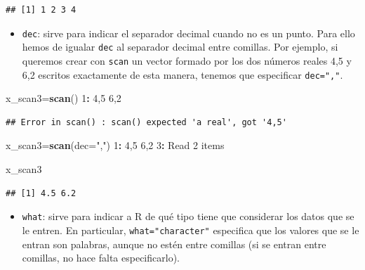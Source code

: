 \documentclass[]{book}
\newenvironment{Shaded}{\begin{snugshade}}{\end{snugshade}}
\newcommand{\DataTypeTok}[1]{\textcolor[rgb]{0.13,0.29,0.53}{#1}}
\newcommand{\DecValTok}[1]{\textcolor[rgb]{0.00,0.00,0.81}{#1}}
\newcommand{\KeywordTok}[1]{\textcolor[rgb]{0.13,0.29,0.53}{\textbf{#1}}}
\newcommand{\NormalTok}[1]{#1}
\newcommand{\OperatorTok}[1]{\textcolor[rgb]{0.81,0.36,0.00}{\textbf{#1}}}
\newcommand{\StringTok}[1]{\textcolor[rgb]{0.31,0.60,0.02}{#1}}
\providecommand{\tightlist}{%
  \setlength{\itemsep}{0pt}\setlength{\parskip}{0pt}}
\theoremstyle{definition}
\theoremstyle{definition}
\theoremstyle{definition}
\theoremstyle{remark}
\begin{document}
\begin{verbatim}
## [1] 1 2 3 4
\end{verbatim}

\begin{itemize}
\tightlist
\item
  \texttt{dec}: sirve para indicar el separador decimal cuando no es un punto.
  Para ello hemos de igualar \texttt{dec} al separador decimal entre comillas.
  Por ejemplo, si queremos crear con \texttt{scan} un vector formado por los dos números reales 4,5 y 6,2 escritos exactamente de esta manera, tenemos que especificar \texttt{dec=","}.
\end{itemize}

\begin{Shaded}
\begin{Highlighting}[]
\NormalTok{x_scan3=}\KeywordTok{scan}\NormalTok{()}
\DecValTok{1}\OperatorTok{:}\StringTok{ }\DecValTok{4}\NormalTok{,}\DecValTok{5} \DecValTok{6}\NormalTok{,}\DecValTok{2}
\end{Highlighting}
\end{Shaded}

\begin{verbatim}
## Error in scan() : scan() expected 'a real', got '4,5'
\end{verbatim}

\begin{Shaded}
\begin{Highlighting}[]
\NormalTok{x_scan3=}\KeywordTok{scan}\NormalTok{(}\DataTypeTok{dec=}\StringTok{","}\NormalTok{)}
\DecValTok{1}\OperatorTok{:}\StringTok{ }\DecValTok{4}\NormalTok{,}\DecValTok{5} \DecValTok{6}\NormalTok{,}\DecValTok{2}
\DecValTok{3}\OperatorTok{:}\StringTok{ }
\NormalTok{Read }\DecValTok{2}\NormalTok{ items}
\end{Highlighting}
\end{Shaded}

\begin{Shaded}
\begin{Highlighting}[]
\NormalTok{x_scan3}
\end{Highlighting}
\end{Shaded}

\begin{verbatim}
## [1] 4.5 6.2
\end{verbatim}

\begin{itemize}
\tightlist
\item
  \texttt{what}: sirve para indicar a R de qué tipo tiene que considerar los datos que se le entren. En particular,
  \texttt{what="character"} especifica que los valores que se le entran son palabras, aunque no estén entre comillas (si se entran entre comillas, no hace falta especificarlo).
\end{itemize}
\end{document}
